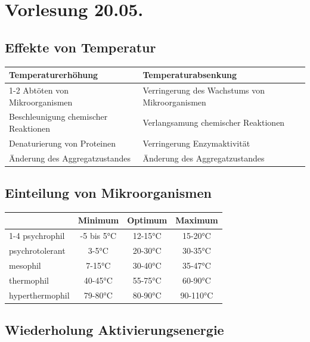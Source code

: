 \documentclass[a4paper,10pt]{article}
\renewcommand{\textbf}[1]{\textsf{{\bfseries {#1}}}}
\begin{document}
\sidebar
{}
\par \vspace*{5mm}
\section{Vorlesung 20.05.}
\subsection{Effekte von Temperatur}
\ppbig
\begin{center}
	\begin{tabular}{l|l}
\textbf{Temperaturerhöhung} & \textbf{Temperaturabsenkung} \\
\cline{1-2}
Abtöten von Mikroorganismen & Verringerung des Wachstums von Mikroorganismen \\ 
Beschleunigung chemischer Reaktionen & Verlangsamung chemischer Reaktionen \\
Denaturierung von Proteinen & Verringerung Enzymaktivität \\
Änderung des Aggregatzustandes & Änderung des Aggregatzustandes
\end{tabular}
	\end{center}	

\subsection{Einteilung von Mikroorganismen}
\ppbig

\begin{center}
\begin{tabular}{l|c|c|c}
 & \textbf{Minimum} &\textbf{Optimum} & \textbf{Maximum} \\
\cline{1-4}
psychrophil & -5 bis 5°C & 12-15°C & 15-20°C \\
psychrotolerant & 3-5°C & 20-30°C & 30-35°C \\
mesophil & 7-15°C & 30-40°C & 35-47°C \\
thermophil & 40-45°C & 55-75°C & 60-90°C \\
hyperthermophil &79-80°C & 80-90°C & 90-110°C \\
\end{tabular}
\end{center}



\subsection{Wiederholung Aktivierungsenergie}
\end{document}
